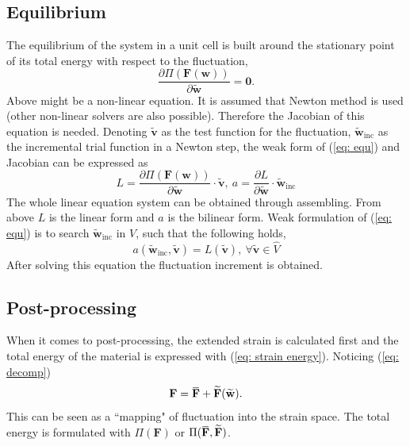 \documentclass[10pt,a4paper]{scrreprt}
\newcommand{\overbar}[1]{\mkern 1.5mu\overline{\mkern-1.5mu#1\mkern-1.5mu}\mkern 1.5mu}
\begin{document}
\subsection{Equilibrium}
The equilibrium of the system in a unit cell is built around the stationary point of its total energy with respect to the fluctuation,
\begin{equation}
\label{eq: equ}
\dfrac{\partial \Pi(\mathbf{F}(\mathbf{w}))}{\partial \widetilde{\mathbf{w}}} = \mathbf{0}.
\end{equation}
Above might be a non-linear equation. It is assumed that Newton method is used (other non-linear solvers are also possible). Therefore the Jacobian of this equation is needed. Denoting $\widetilde{\mathbf{v}}$ as the test function for the fluctuation, $\widetilde{\mathbf{w}}_{\text{inc}}$ as the incremental trial function in a Newton step, the weak form of (\ref{eq: equ}) and Jacobian can be expressed as
\begin{equation}
\label{eq: bi and li}
L = \dfrac{\partial \Pi(\mathbf{F}(\mathbf{w}))}{\partial \widetilde{\mathbf{w}}} \cdot \widetilde{\mathbf{v}}, \ a = \dfrac{\partial L}{\partial \widetilde{\mathbf{w}}} \cdot \widetilde{\mathbf{w}}_{\text{inc}}
\end{equation}
The whole linear equation system can be obtained through assembling. From above $L$ is the linear form and $a$ is the bilinear form. Weak formulation of (\ref{eq: equ}) is to search $\widetilde{\mathbf{w}}_{\text{inc}}$ in $V$, such that the following holds,
\begin{equation}
a(\widetilde{\mathbf{w}}_{\text{inc}}, \widetilde{\mathbf{v}}) = L(\widetilde{\mathbf{v}}),\ \forall  \widetilde{\mathbf{v}} \in \hat{V}
\end{equation}
After solving this equation the fluctuation increment is obtained.

\subsection{Post-processing}
When it comes to post-processing, the extended strain is calculated first and the total energy of the material is expressed with (\ref{eq: strain energy}). Noticing (\ref{eq: decomp})
\begin{equation}
\mathbf{F} = \overbar{\mathbf{F}} + \widetilde{\mathbf{F}}(\widetilde{\mathbf{w}}).
\end{equation}
This can be seen as a ``mapping" of fluctuation into the strain space. The total energy is formulated with $\Pi(\mathbf{F})$ or $\Pi(\overbar{\mathbf{F}},\widetilde{\mathbf{F}})$.
\end{document}
